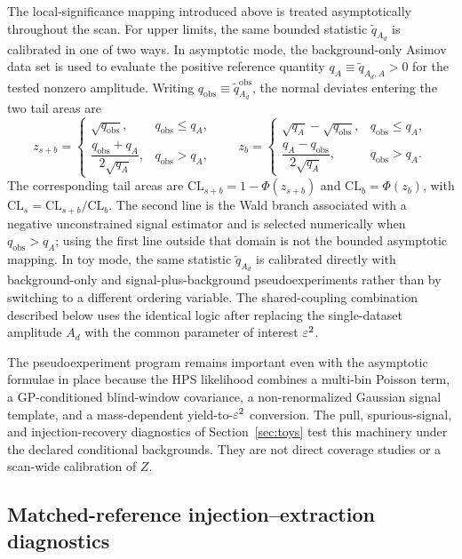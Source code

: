 The local-significance mapping introduced above is treated asymptotically throughout
the scan. For upper limits, the same bounded statistic
$\tilde q_{A_d}$ is calibrated in one of two ways. In asymptotic mode, the
background-only Asimov data set is used to evaluate the positive reference quantity
$q_A\equiv\tilde q_{A_d,A}>0$ for the tested nonzero amplitude. Writing
$q_{\mathrm{obs}}\equiv\tilde q_{A_d}^{\mathrm{obs}}$, the normal deviates entering
the two tail areas are
\begin{equation}
z_{s+b}=
\begin{cases}
\sqrt{q_{\mathrm{obs}}}, & q_{\mathrm{obs}}\le q_A,\\[2pt]
\dfrac{q_{\mathrm{obs}}+q_A}{2\sqrt{q_A}}, & q_{\mathrm{obs}}>q_A,
\end{cases}
\qquad
z_b=
\begin{cases}
\sqrt{q_A}-\sqrt{q_{\mathrm{obs}}}, & q_{\mathrm{obs}}\le q_A,\\[2pt]
\dfrac{q_A-q_{\mathrm{obs}}}{2\sqrt{q_A}}, & q_{\mathrm{obs}}>q_A.
\end{cases}
\label{eq:cls-asymptotic}
\end{equation}
The corresponding tail areas are
$\mathrm{CL}_{s+b}=1-\Phi(z_{s+b})$ and $\mathrm{CL}_{b}=\Phi(z_b)$, with
$\mathrm{CL}_s=\mathrm{CL}_{s+b}/\mathrm{CL}_b$. The second line is the Wald branch
associated with a negative unconstrained signal estimator and is selected numerically
when $q_{\mathrm{obs}}>q_A$; using the first line outside that domain is not the
bounded asymptotic mapping.
In toy mode, the same statistic $\tilde q_{A_d}$ is calibrated directly with
background-only and signal-plus-background pseudoexperiments rather than by switching
to a different ordering variable. The shared-coupling combination described below uses
the identical logic after replacing the single-dataset amplitude $A_d$ with the common
parameter of interest $\varepsilon^2$.

The pseudoexperiment program remains important even with the asymptotic formulae in
place because the HPS likelihood combines a multi-bin Poisson term, a GP-conditioned
blind-window covariance, a non-renormalized Gaussian signal template, and a
mass-dependent yield-to-$\varepsilon^2$ conversion. The pull, spurious-signal, and
injection-recovery diagnostics of Section~\ref{sec:toys} test this machinery under the
declared conditional backgrounds. They are not direct \CLs{} coverage studies or a
scan-wide calibration of $Z$.

\subsection{Matched-reference injection--extraction diagnostics}
\label{sec:matched-reference-diagnostics}

